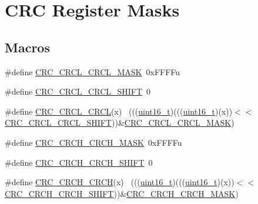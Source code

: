 \hypertarget{group___c_r_c___register___masks}{}\section{C\+RC Register Masks}
\label{group___c_r_c___register___masks}
\subsection*{Macros}
\begin{DoxyCompactItemize}
\item 
\#define \hyperlink{group___c_r_c___register___masks_ga41565ef941db78c9470646b7246e78a1}{C\+R\+C\+\_\+\+C\+R\+C\+L\+\_\+\+C\+R\+C\+L\+\_\+\+M\+A\+SK}~0x\+F\+F\+F\+Fu
\item 
\#define \hyperlink{group___c_r_c___register___masks_ga0b4ef9a44a372a3fc83d3a414a4a976b}{C\+R\+C\+\_\+\+C\+R\+C\+L\+\_\+\+C\+R\+C\+L\+\_\+\+S\+H\+I\+FT}~0
\item 
\#define \hyperlink{group___c_r_c___register___masks_gaddadfc7b1b0cc564ed86759d201f8a5d}{C\+R\+C\+\_\+\+C\+R\+C\+L\+\_\+\+C\+R\+CL}(x)                                              ~(((\hyperlink{_p_e___types_8h_a1f1825b69244eb3ad2c7165ddc99c956}{uint16\+\_\+t})(((\hyperlink{_p_e___types_8h_a1f1825b69244eb3ad2c7165ddc99c956}{uint16\+\_\+t})(x))$<$$<$\hyperlink{group___c_r_c___register___masks_ga0b4ef9a44a372a3fc83d3a414a4a976b}{C\+R\+C\+\_\+\+C\+R\+C\+L\+\_\+\+C\+R\+C\+L\+\_\+\+S\+H\+I\+FT}))\&\hyperlink{group___c_r_c___register___masks_ga41565ef941db78c9470646b7246e78a1}{C\+R\+C\+\_\+\+C\+R\+C\+L\+\_\+\+C\+R\+C\+L\+\_\+\+M\+A\+SK})
\item 
\#define \hyperlink{group___c_r_c___register___masks_ga0d262484bee068f2b06d17d24447bec7}{C\+R\+C\+\_\+\+C\+R\+C\+H\+\_\+\+C\+R\+C\+H\+\_\+\+M\+A\+SK}~0x\+F\+F\+F\+Fu
\item 
\#define \hyperlink{group___c_r_c___register___masks_ga622add8b361a806791891fb0dd4c397e}{C\+R\+C\+\_\+\+C\+R\+C\+H\+\_\+\+C\+R\+C\+H\+\_\+\+S\+H\+I\+FT}~0
\item 
\#define \hyperlink{group___c_r_c___register___masks_gac12c9fe0b28e83b002ce28b93c70f538}{C\+R\+C\+\_\+\+C\+R\+C\+H\+\_\+\+C\+R\+CH}(x)                                              ~(((\hyperlink{_p_e___types_8h_a1f1825b69244eb3ad2c7165ddc99c956}{uint16\+\_\+t})(((\hyperlink{_p_e___types_8h_a1f1825b69244eb3ad2c7165ddc99c956}{uint16\+\_\+t})(x))$<$$<$\hyperlink{group___c_r_c___register___masks_ga622add8b361a806791891fb0dd4c397e}{C\+R\+C\+\_\+\+C\+R\+C\+H\+\_\+\+C\+R\+C\+H\+\_\+\+S\+H\+I\+FT}))\&\hyperlink{group___c_r_c___register___masks_ga0d262484bee068f2b06d17d24447bec7}{C\+R\+C\+\_\+\+C\+R\+C\+H\+\_\+\+C\+R\+C\+H\+\_\+\+M\+A\+SK})

\end{DoxyCompactItemize}
